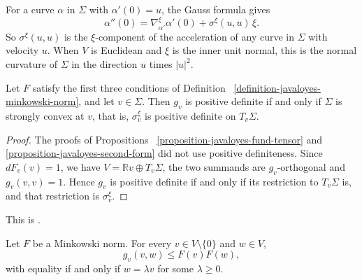 \begin{remark}
\label{remark-javaloyes-second-form-curves}
For a curve $\alpha$ in $\Sigma$ with
$\alpha'(0) = u$, the Gauss formula gives
$$
\alpha''(0) = \nabla^\xi_{\alpha'}\alpha'(0)
+ \sigma^\xi(u,u)\, \xi.
$$
So $\sigma^\xi(u,u)$ is the
$\xi$-component of the acceleration of any
curve in $\Sigma$ with velocity $u$. When
$V$ is Euclidean and $\xi$ is the inner
unit normal, this is the normal curvature
of $\Sigma$ in the direction $u$ times
$|u|^2$.
\end{remark}

\begin{corollary}
\label{corollary-javaloyes-strong-convexity}
Let $F$ satisfy the first three conditions
of Definition~%
\ref{definition-javaloyes-minkowski-norm},
and let $v \in \Sigma$. Then $g_v$ is
positive definite if and only if
$\Sigma$ is strongly convex at $v$, that
is, $\sigma^\xi_v$ is positive definite
on $T_v\Sigma$.
\end{corollary}

\begin{proof}
The proofs of
Propositions~%
\ref{proposition-javaloyes-fund-tensor}
and~%
\ref{proposition-javaloyes-second-form}
did not use positive definiteness. Since
$dF_v(v) = 1$, we have
$V = \mathbb{R}v \oplus T_v\Sigma$, the two
summands are $g_v$-orthogonal and
$g_v(v,v) = 1$. Hence $g_v$ is positive
definite if and only if its restriction to
$T_v\Sigma$ is, and that restriction is
$\sigma^\xi_v$.
\end{proof}

\noindent
This is \cite[Proposition 2.3(v)]%
{javaloyes2014definition}.

\begin{proposition}
\label{proposition-javaloyes-fund-ineq}
Let $F$ be a Minkowski norm. For every
$v \in V \setminus \{0\}$ and $w \in V$,
$$
g_v(v,w) \leq F(v)F(w),
$$
with equality if and only if $w = \lambda v$
for some $\lambda \geq 0$.
\end{proposition}

